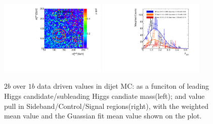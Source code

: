 \begin{figure}[htbp!]
\begin{center}
\includegraphics[width=0.45\textwidth,angle=-90]{figures/boosted/AppendixMuqcdstudy/QCD_TwoTag_Incl_mH0H1.pdf}
\includegraphics[width=0.45\textwidth,angle=-90]{figures/boosted/AppendixMuqcdstudy/QCD_TwoTag_Incl_mH0H1_pull.pdf}
\caption{$2b$ over $1b$ data driven \muqcd values in dijet MC: \muqcd as a funciton of leading Higgs candidate/subleading Higgs candiate mass(left); and \muqcd value pull in Sideband/Control/Signal regions(right), with the weighted mean value and the Guassian fit mean value shown on the plot.}
\label{fig:app-muqcd-2b-qcd}
\end{center}
\end{figure}

